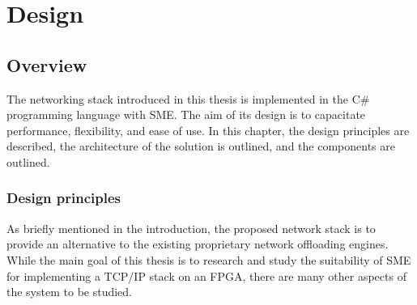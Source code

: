 \chapter{Design}

\section{Overview}
The networking stack introduced in this thesis is implemented in the C\# 
programming language with SME. The aim of its design is to capacitate performance,
flexibility, and ease of use. In this chapter, the design principles are 
described, the architecture of the solution is outlined, and the components are
outlined.


\subsection{Design principles}
As briefly mentioned in the introduction, the proposed network stack is to 
provide an alternative to the existing proprietary network offloading engines.
While the main goal of this thesis is to research and study the suitability of 
SME for implementing a TCP/IP stack on an FPGA, there are many other aspects of the 
system to be studied.\\

